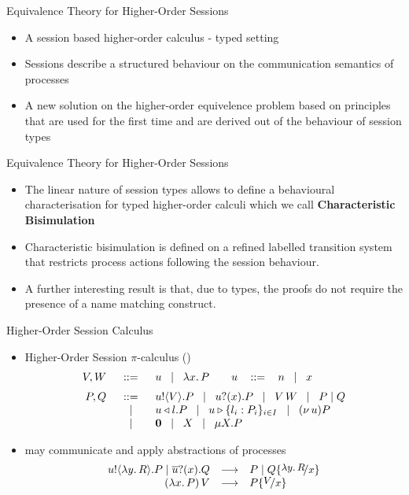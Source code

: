 \documentclass{beamer}
\begin{document}
	\begin{frame}{Equivalence Theory for Higher-Order Sessions}
		\begin{itemize}
			\item	A session based higher-order calculus - typed setting

			\item	Sessions describe a structured behaviour on the communication semantics of processes

			\item	A new solution on the higher-order equivelence problem based
				on principles that are
				used for the first time and are derived out of the behaviour of session types
		\end{itemize}
	\end{frame}


	\begin{frame}{Equivalence Theory for Higher-Order Sessions}
		\begin{itemize}
			\item	The linear nature of session types allows to define
				a behavioural characterisation for typed higher-order calculi
				which we call {\bf Characteristic Bisimulation}

			\item	Characteristic bisimulation is defined on a refined labelled transition system
				that restricts process actions following the session behaviour.

			\item	A further interesting result is that, due to types, the proofs do
				not require the presence of a name matching construct.
		\end{itemize}
	\end{frame}

	\begin{frame}{Higher-Order Session Calculus}
		\begin{itemize}
			\item	Higher-Order Session $\pi$-calculus (\HOp)
				\[
					\begin{array}{rcl}
						V, W &\;\;::=\;\;& u \;\;\;|\;\;\; \lambda x.\,P \qquad u\ \;\;::=\;\;\ n \;\;\;|\;\;\; x \\[2mm]
						P, Q &\;\;::=\;\;& u ! \langle V \rangle . P \;\;\;|\;\;\; u ? (x) . P \;\;\;|\;\;\; V\, {W} \;\;\;|\;\;\; P \;|\; Q \\
						&\;\;\;|\;\;\;& u \triangleleft l . P \;\;\;|\;\;\; u \triangleright \{l_i: P_i\}_{i \in I} \;\;\;|\;\;\; (\nu\, u) P \\
						&\;\;\;|\;\;\;& \mathbf{0} \;\;\;|\;\;\; X \;\;\;|\;\;\; \mu X. P
					\end{array}
				\]

			\item	\HOp may communicate and apply abstractions of processes%
				\[
					\begin{array}{rcl}
						\bout{u}{\abs{y}{R}} P \Par \binp{\dual{u}}{x} Q &\red& P \Par Q \subst{\abs{y}{R}}{x}\\
						\appl{(\abs{x}{P})}{V} &\red& P \subst{V}{x}
					\end{array}
				\]
		\end{itemize}
	\end{frame}
\end{document}
